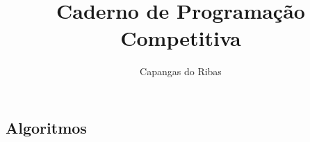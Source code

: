 \documentclass{article}
\title{Caderno de Programação Competitiva}
\author{Capangas do Ribas}
\date{}
\begin{document}
\maketitle
\thispagestyle{fancy}
\begin{multicols}{2}

\tableofcontents
\newpage

\section{Algoritmos}


\end{multicols}
\end{document}
